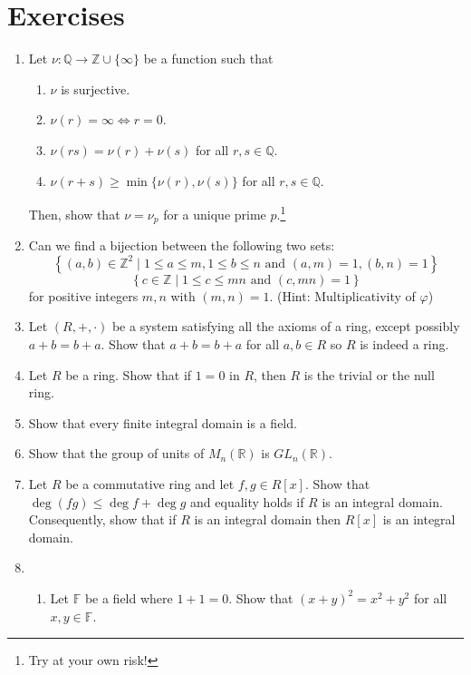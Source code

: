 \newpage
\section{Exercises}

\begin{enumerate}
    \item Let $\nu \colon \mathbb{Q} \to \mathbb{Z} \cup \{\infty\}$ be a function such that 
    \begin{enumerate}
        \item $\nu$ is surjective.
        \item $\nu(r) = \infty \iff r = 0$.
        \item $\nu(rs) = \nu(r) + \nu(s)$ for all $r,s \in \mathbb{Q}$.
        \item $\nu(r + s) \geq \min\{\nu(r), \nu(s)\}$ for all $r,s \in \mathbb{Q}$.
    \end{enumerate}
    Then, show that $\nu = \nu_p$ for a unique prime $p$.\footnote{Try at your own risk!}
    \item \label{problem:multiplicativity_bijection} Can we find a bijection between the following two sets:
    \[
        \left\{ (a,b) \in \mathbb{Z}^2 \mid 1 \leq a \leq m, 1 \leq b \leq n \text{ and } (a,m) = 1, (b,n) = 1 \right\}
    \] 
    \[
        \left\{ c \in \mathbb{Z} \mid 1 \leq c \leq mn \text{ and } (c,mn) = 1 \right\}
    \]
    for positive integers $m,n$ with $(m,n) = 1$. (Hint: Multiplicativity of $\varphi$)
    \item Let $(R,+,\cdot)$ be a system satisfying all the axioms of a ring, except possibly $a+b = b+a$. Show that $a+b = b+a$ for all $a,b \in R$ so $R$ is indeed a ring. 
    \item Let $R$ be a ring. Show that if $1 = 0$ in $R$, then $R$ is the trivial or the null ring.
    \item Show that every finite integral domain is a field.
    \item Show that the group of units of $M_n(\mathbb{R})$ is $GL_n(\mathbb{R})$.
    \item Let $R$ be a commutative ring and let $f,g \in R[x]$. Show that $\deg(fg) \leq \deg f + \deg g$ and equality holds if $R$ is an integral domain. Consequently, show that if $R$ is an integral domain then $R[x]$ is an integral domain.
    \item \begin{enumerate}
        \item Let $\mathbb{F}$ be a field where $1+1 = 0$. Show that $(x+y)^2 = x^2 + y^2$ for all $x,y \in \mathbb{F}$.

\end{enumerate}
\end{enumerate}
